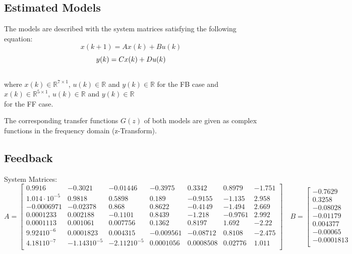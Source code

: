 \begin{landscape}
\chapter{Estimated Models}\label{sec:models}

The models are described with the system matrices satisfying the following equation:
\[x(k + 1) = Ax(k) + Bu(k)\]
\[y(k) = Cx(k) + Du(k)\\\]
\\
where $x(k) \in \mathbb{R}^{7\times1}$, $u(k) \in \mathbb{R}$ and $y(k) \in \mathbb{R}$ for the FB case and $x(k) \in \mathbb{R}^{5\times1}$, $u(k) \in \mathbb{R}$ and $y(k) \in \mathbb{R}$\\ for the FF case.

The corresponding transfer functions $G(z) $ of both models are given as complex functions in the frequency domain (z-Transform).

\section{Feedback}

System Matrices:
\[A = \left[ \begin{array}{ccccccc}

0.9916 & -0.3021 & -0.01446 & -0.3975 & 0.3342 & 0.8979 & -1.751\\
1.014\cdot10^{-5} & 0.9818 & 0.5898 & 0.189 & -0.9155 & -1.135 & 2.958\\
-0.0006971 & -0.02378 & 0.868 & 0.8622 & -0.4149 & -1.494 & 2.669\\
0.0001233 & 0.002188 & -0.1101 & 0.8439 & -1.218 & -0.9761 & 2.992\\
0.0001113 & 0.001061 & 0.007756 & 0.1362 & 0.8197 & 1.692 & -2.22\\
9.92410^{-6} & 0.0001823 & 0.004315 & -0.009561 & -0.08712 & 0.8108 & -2.475\\
4.18110^{-7} & -1.14310^{-5} & -2.11210^{-5} & 0.0001056 & 0.0008508 & 0.02776 & 1.011\\

\end{array} \right] \quad B = \left[ \begin{array}{c}

-0.7629\\
0.3258\\
-0.08028\\
-0.01179\\
0.004377\\
-0.00065\\
-0.0001813\\


\end{array}\]
\end{landscape}
